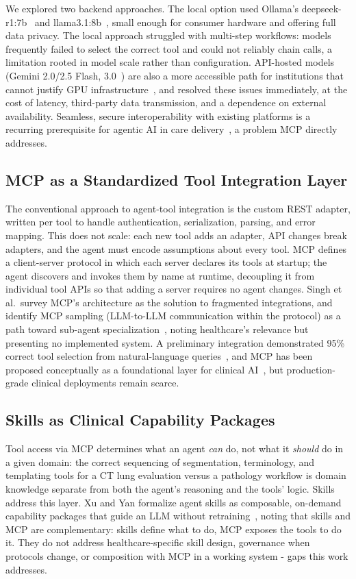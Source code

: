 \documentclass[conference]{IEEEtran}
\begin{document}
We explored two backend approaches. The local option used Ollama's deepseek-r1:7b~\cite{deepseekr1} and llama3.1:8b~\cite{llama31}, small enough for consumer hardware and offering full data privacy. The local approach struggled with multi-step workflows: models frequently failed to select the correct tool and could not reliably chain calls, a limitation rooted in model scale rather than configuration. API-hosted models (Gemini 2.0/2.5 Flash, 3.0~\cite{gemini2025}) are also a more accessible path for institutions that cannot justify GPU infrastructure~\cite{agiformedicalimaging2025}, and resolved these issues immediately, at the cost of latency, third-party data transmission, and a dependence on external availability. Seamless, secure interoperability with existing platforms is a recurring prerequisite for agentic AI in care delivery~\cite{dietrich2025agentic}, a problem MCP directly addresses.

\subsection{MCP as a Standardized Tool Integration Layer}
The conventional approach to agent-tool integration is the custom REST adapter, written per tool to handle authentication, serialization, parsing, and error mapping. This does not scale: each new tool adds an adapter, API changes break adapters, and the agent must encode assumptions about every tool. MCP defines a client-server protocol in which each server declares its tools at startup; the agent discovers and invokes them by name at runtime, decoupling it from individual tool APIs so that adding a server requires no agent changes. Singh et al.\ survey MCP's architecture as the solution to fragmented integrations, and identify MCP sampling (LLM-to-LLM communication within the protocol) as a path toward sub-agent specialization~\cite{mcp-aditi}, noting healthcare's relevance but presenting no implemented system. A preliminary integration demonstrated 95\% correct tool selection from natural-language queries~\cite{mcphosts2025}, and MCP has been proposed conceptually as a foundational layer for clinical AI~\cite{transformingclinical2026}, but production-grade clinical deployments remain scarce.

\subsection{Skills as Clinical Capability Packages}
Tool access via MCP determines what an agent \emph{can} do, not what it \emph{should} do in a given domain: the correct sequencing of segmentation, terminology, and templating tools for a CT lung evaluation versus a pathology workflow is domain knowledge separate from both the agent's reasoning and the tools' logic. Skills address this layer. Xu and Yan formalize agent skills as composable, on-demand capability packages that guide an LLM without retraining~\cite{agentskillslargelanguage}, noting that skills and MCP are complementary: skills define what to do, MCP exposes the tools to do it. They do not address healthcare-specific skill design, governance when protocols change, or composition with MCP in a working system - gaps this work addresses.
\end{document}
